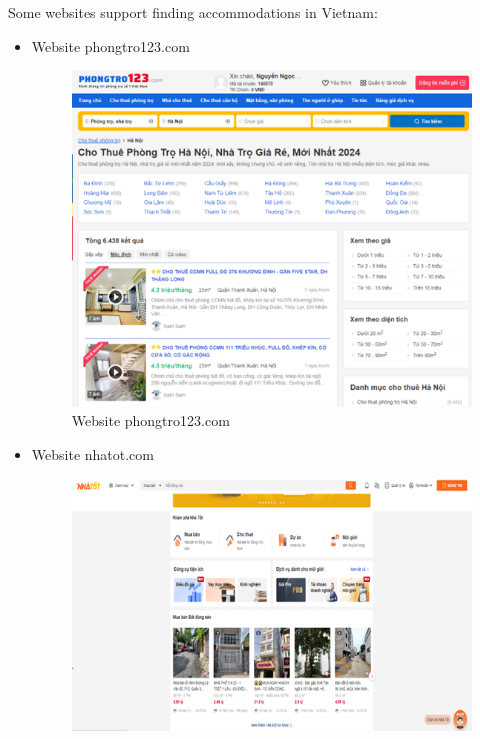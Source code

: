 \documentclass[../Main.tex]{subfiles}
\begin{document}
Some websites support finding accommodations in Vietnam:

\begin{itemize}
    \item Website phongtro123.com
          \begin{figure}[H]
              \centering
              \includegraphics[width=\textwidth]{Figure/Picture1.png}
              \caption{Website phongtro123.com}
              \label{fig:phongtro123}
          \end{figure}
    \item Website nhatot.com
          \begin{figure}[H]
              \centering
              \includegraphics[width=\textwidth]{Figure/Picture2.png}

\end{figure}
\end{itemize}
\end{document}
